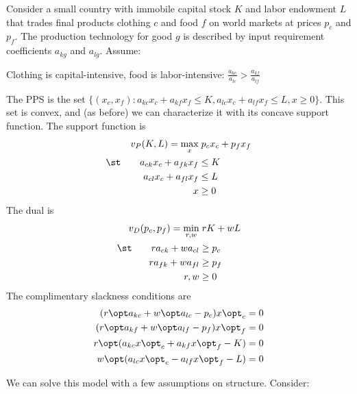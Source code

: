 \documentclass[10pt]{article}
\begin{document}
\begin{model}
	 Consider a small country with immobile capital stock $K$ and labor endowment $L$ that trades final products clothing $c$ and food $f$ on world markets at prices $p_c$ and $p_f$. The production technology for good $g$ is described by input requirement coefficients $a_{kg}$ and $a_{lg}$. Assume:
	
	\begin{assumption}\label{ass:hov_1}
		Clothing is capital-intensive, food is labor-intensive: $\frac{a_{kc}}{a_{lc}} > \frac{a_{kf}}{a_{lf}}$
	\end{assumption}
	The PPS is the set $\{(x_c,x_f) : a_{kc}x_c + a_{kf}x_f \le K, a_{lc}x_c + a_{lf}x_f \le L, x \ge 0\}$. This set is convex, and (as before) we can characterize it with its concave support function. The support function is \begin{align*} v_P(K,L) = \max_x &\; p_cx_c + p_fx_f \\ \st \qquad a_{ck}x_c + a_{fk}x_f &\le K \\ a_{cl}x_c + a_{fl}x_f &\le L \\ x &\ge 0 \end{align*}The dual is\begin{align*} v_D(p_c,p_f) = \min_{r,w}&\;rK+wL \\ \st \qquad ra_{ck} + wa_{cl} &\ge p_c \\ ra_{fk} + wa_{fl} &\ge p_f \\ r,w &\ge 0\end{align*}The complimentary slackness conditions are \begin{align*} (r\opt a_{kc} + w\opt a_{lc} - p_c)x\opt_c &= 0 \\ (r\opt a_{kf} + w\opt a_{lf} - p_f)x\opt_f &= 0 \\ r\opt(a_{kc}x\opt_c + a_{kf}x\opt_f - K) &= 0 \\ w\opt (a_{lc}x\opt_c - a_{lf}x\opt_f - L) &= 0 \end{align*}
\end{model}


We can solve this model with a few assumptions on structure. Consider:
\end{document}
